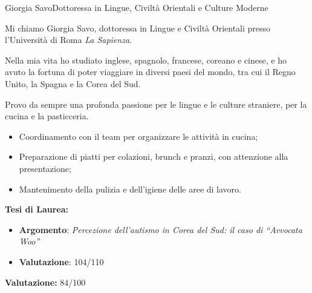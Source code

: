 \documentclass{article}
\begin{document}
\begin{cv}[avatar]{Giorgia Savo}{Dottoressa in Lingue, Civiltà Orientali e Culture Moderne}


\small
Mi chiamo Giorgia Savo, dottoressa in Lingue e Civiltà Orientali presso l'Università di Roma \textit{La Sapienza}.

Nella mia vita ho studiato inglese, spagnolo, francese, coreano e cinese,
e ho avuto la fortuna di poter viaggiare in diversi paesi del mondo, tra cui il Regno Unito, la Spagna e la Corea del Sud.

Provo da sempre una profonda passione per le lingue e le culture straniere, per la cucina e la pasticceria.

\normalsize
{}  %

\begin{cvevent}[Ottobre 2024][Dicembre 2024]
    \begin{itemize}
	\item Coordinamento con il team per organizzare le attività in cucina;  
        \item Preparazione di piatti per colazioni, brunch e pranzi, con attenzione alla presentazione;  
        \item Mantenimento della pulizia e dell'igiene delle aree di lavoro.
    \end{itemize}
\end{cvevent}


\begin{cvevent}[Settembre 2019][Settembre 2023]
    \textbf{Tesi di Laurea:}
    \begin{itemize}
        \item \textbf{Argomento}: \textit{Percezione dell’autismo in Corea del Sud: il caso di “Avvocata Woo”}
        \item \textbf{Valutazione}: 104/110
    \end{itemize}
\end{cvevent}

\begin{cvevent}[Settembre 2014][Luglio 2019]
	\textbf{Valutazione:} 84/100
\end{cvevent}


\end{cv}
\end{document}
